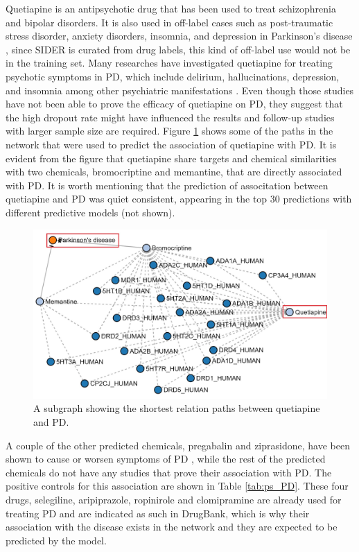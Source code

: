 Quetiapine is an antipsychotic drug that has been used to treat schizophrenia and bipolar disorders. It is also used in off-label cases such as post-traumatic stress disorder, anxiety disorders, insomnia, and depression in Parkinson’s disease \cite{el-saifi_quetiapine_2016}, since SIDER is curated from drug labels, this kind of off-label use would not be in the training set. Many researches have investigated quetiapine for treating psychotic symptoms in \ac{PD}, which include delirium, hallucinations, depression, and insomnia among other psychiatric manifestations \cite{desmarais_quetiapine_2016}. Even though those studies have not been able to prove the efficacy of quetiapine on \ac{PD}, they suggest that the high dropout rate might have influenced the results and follow-up studies with larger sample size are required. Figure \ref{fig:parkinson_quetiapine} shows some of the paths in the network that were used to predict the association of quetiapine with \ac{PD}. It is evident from the figure that quetiapine share targets and chemical similarities with two chemicals, bromocriptine and memantine, that are directly associated with \ac{PD}. It is worth mentioning that the prediction of associtation between quetiapine and \ac{PD} was quiet consistent, appearing in the top 30 predictions with different predictive models (not shown). 

\begin{figure}[h!]
    \centering
    \includegraphics[scale=0.6]
    {figures/parkinson_quetiapine.jpg}
    \caption[Quetiapine-PD path subgraph]{\label{fig:parkinson_quetiapine} A subgraph showing the shortest relation paths between quetiapine and \ac{PD}.}
\end{figure}

A couple of the other predicted chemicals, pregabalin and ziprasidone, have been shown to cause or worsen symptoms of \ac{PD} \cite{perez_lloret_pregabalin-induced_2009, younce_systematic_2019}, while the rest of the predicted chemicals do not have any studies that prove their association with \ac{PD}. The positive controls for this association are shown in Table \ref{tab:ps_PD}. These four drugs, selegiline, aripiprazole, ropinirole and clomipramine are already used for treating \ac{PD} and are indicated as such in DrugBank, which is why their association with the disease exists in the network and they are expected to be predicted by the model.

